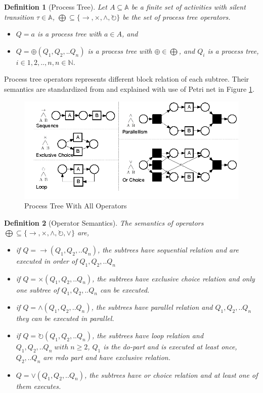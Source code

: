 \documentclass[]{article}
\newtheorem{mydef}{Definition}[section]
\begin{document}
\begin{mydef}[Process Tree]
	Let $ A \subseteq \mathbb{A} $ be a finite set of activities with silent transition $\tau \in \mathbb{A}$, $\bigoplus \subseteq \{\rightarrow, \times, \land, \circlearrowright\}$ be the set of process tree operators. 
	\begin{itemize}
		\item $Q=a$ is a process tree with $a\in A$, and 
		\item $Q= \oplus (Q_1 , Q_2 ,.. Q_n)$ is a process tree with $\oplus \in \bigoplus$, and $Q_i$ is a process tree, $i\in{1,2,..,n}, n\in \mathbb{N}$. 
	\end{itemize}
\end{mydef}
Process tree operators represents different block relation of each subtree. Their semantics are standardized from \cite{vanderAalst:2016:PMD:2948762, Buijs2012OnTR} and explained with use of Petri net in Figure \ref{fig:pn_pt_relation}\cite{Buijs2012OnTR}.
\begin{figure}[h!]
 	\includegraphics[width=\textwidth]{PT05_Petrinet_PT_Relation.png}
 	\caption{Process Tree With All Operators}
 	\label{fig:pn_pt_relation}
\end{figure}
\begin{mydef}[Operator Semantics] 
	The semantics of operators $\bigoplus \subseteq \{\rightarrow, \times, \land, \circlearrowright, \vee \}$ are,
	\begin{itemize}
		\item if $Q= \rightarrow(Q_1 , Q_2 ,.. Q_n)$, the subtrees have sequential relation and are executed in order of $Q_1,Q_2,..Q_n$
		\item if $Q= \times(Q_1 , Q_2 ,.. Q_n)$,  the subtrees have exclusive choice relation and only one subtree of $Q_1,Q_2,..Q_n$   can be executed.
		\item if $Q= \land (Q_1 , Q_2 ,.. Q_n)$,  the subtrees have parallel relation and $Q_1,Q_2,..Q_n$ they can be executed in parallel.
		\item if $Q= \circlearrowright(Q_1 , Q_2 ,.. Q_n)$,  the subtrees have loop relation and $Q_1,Q_2,..Q_n \; with\; n\geq2$, $Q_1$ is the do-part and is executed at least once, $Q_2,..Q_n$ are redo part and have exclusive relation.
		\item $Q=\vee(Q_1 , Q_2 ,.. Q_n)$, the subtrees have or choice relation and at least one of them executes.
	\end{itemize}
\end{mydef}
\end{document}
